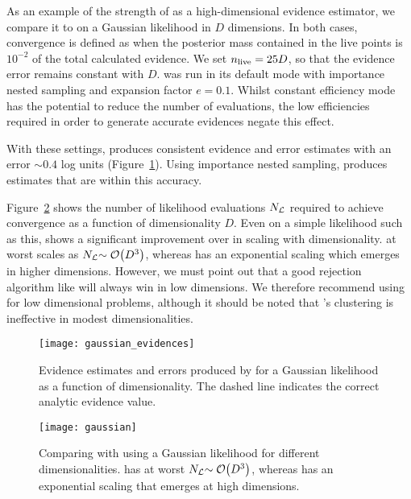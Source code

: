 As an example of the strength of \PolyChord{} as a high-dimensional evidence estimator, we compare it to \MultiNest{} on a Gaussian likelihood in $D$ dimensions.  In both cases, convergence is defined as when the posterior mass contained in the live points is $10^{-2}$ of the total calculated evidence.  We set $n_{\mathrm{live}}=25D$, so that the evidence error remains constant with $D$. \MultiNest{} was run in its default mode with importance nested sampling and expansion factor $e=0.1$.  Whilst constant efficiency mode has the potential to reduce the number of \MultiNest{} evaluations, the low efficiencies required in order to generate accurate evidences negate this effect.                                       


With these settings, \PolyChord{} produces consistent evidence and error estimates with an error $\sim0.4$ log units (Figure~\ref{fig:pc:gaussian_evidences}). Using importance nested sampling, \MultiNest{} produces estimates that are within this accuracy.

Figure~\ref{fig:pc:gaussian} shows the number of likelihood evaluations $N_{\mathcal{L}}$ required to achieve convergence as a function of dimensionality $D$. 
Even on a simple likelihood such as this, \PolyChord{} shows a significant improvement over \MultiNest{} in scaling with dimensionality.  \PolyChord{} at worst scales as ${N_{\mathcal{L}}{\sim\mathcal{O}{\left(D^3\right)}}}$, whereas \MultiNest{} has an exponential scaling which emerges in higher dimensions.
However, we must point out that a good rejection algorithm like \MultiNest{} will always win in low dimensions. We therefore recommend using \MultiNest{} for low dimensional problems, although it should be noted that \MultiNest{}'s clustering is ineffective in modest dimensionalities.

\begin{figure}
  \centering
  \texttt{[image: gaussian\_evidences]}
  \caption{%
    Evidence estimates and errors produced by \PolyChord{} for a Gaussian likelihood as a function of dimensionality. The dashed line indicates the correct analytic evidence value.\label{fig:pc:gaussian_evidences}
}
\end{figure}

\begin{figure}
  \centering
  \texttt{[image: gaussian]}
  \caption{Comparing \PolyChord{} with \MultiNest{} using a
  Gaussian likelihood for different dimensionalities. \PolyChord{} has at worst $N_{\mathcal{L}}{\sim\mathcal{O}{\left(D^3\right)}}$, whereas \MultiNest{} has an exponential scaling that emerges at high dimensions.\label{fig:pc:gaussian}
}
\end{figure}

